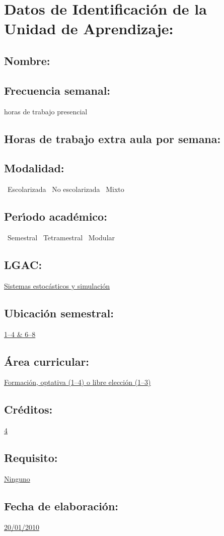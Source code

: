 \documentclass[10 pt]{article}
\begin{document}

\section{Datos de Identificaci\'{o}n de la Unidad de Aprendizaje:}
\subsection{Nombre:} 
\subsection{Frecuencia semanal:} horas de trabajo presencial 
\subsection{Horas de trabajo extra aula por semana:} 
\subsection{Modalidad:} \yes~Escolarizada \no~No escolarizada \no~Mixto
\subsection{Per\'{\i}odo acad\'{e}mico:} \yes~Semestral
\no~Tetramestral \no~Modular
\subsection{LGAC:} \underline{Sistemas estoc\'{a}sticos y simulaci\'{o}n}
\subsection{Ubicaci\'{o}n semestral:} \underline{1--4 \& 6--8}
\subsection{\'{A}rea curricular:} \underline{Formaci\'{o}n, optativa (1--4) o libre
  elecci\'{o}n (1--3)}
\subsection{Cr\'{e}ditos:} \underline{4}
\subsection{Requisito:} \underline{Ninguno}
\subsection{Fecha de elaboraci\'{o}n:} \underline{20/01/2010}
\end{document}
